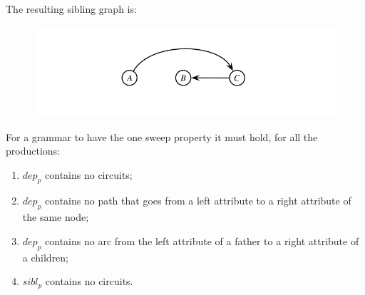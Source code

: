 \documentclass[10pt,a4paper]{article}
\begin{document}
						The resulting sibling graph is:
						\begin{figure}[H]
							\centering
							\includegraphics[width = \textwidth]{./images/sibling.png}
						\end{figure}
						For a grammar to have the one sweep property it must hold, for all the productions:
						\begin{enumerate}
							\item $dep_p$ contains no circuits;
							\item $dep_p$ contains no path that goes from a left attribute to a right attribute of the same node;
							\item $dep_p$ contains no arc from the left attribute of a father to a right attribute of a children;
							\item $sibl_p$ contains no circuits. 
						\end{enumerate}
				
\end{document}
